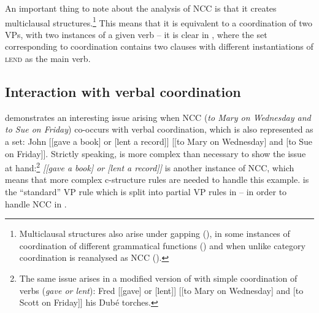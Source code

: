 \documentclass[output=paper]{../langscibook}
\begin{document}
An important thing to note about the \citet{max:man:96} analysis of NCC
is that it creates multiclausal structures.\footnote{Multiclausal
  structures also arise under gapping (), in
  some instances of coordination of different grammatical functions
  () and when unlike category coordination is
  reanalysed as NCC ().} This means that it is equivalent to a
coordination of two VPs, with two instances of a given verb – it is
clear in , where the set corresponding to
coordination contains two clauses with different instantiations of \textsc{lend} as the main verb.

\subsection{Interaction with verbal coordination}
\label{sec:Coordination:NCC:sets}
\largerpage
{} demonstrates an
interesting issue arising when NCC
(\emph{to Mary on Wednesday and to Sue on Friday}) co-occurs with
verbal coordination, which is also represented as a set:
\ea\label{ex:max:man:96:43} John [[gave a book] or [lent a record]] [[to Mary on Wednesday] and [to Sue on Friday]]. \hfill\citep[(43)]{max:man:96}
\z
Strictly speaking,  is more complex than necessary to show the
issue at hand:\footnote{The same issue arises in a modified version
  of  with simple coordination of verbs (\emph{gave or
  lent}):
\ea Fred [[gave] or [lent]] [[to Mary on Wednesday] and [to Scott on Friday]] his Dubé torches.
\z
}
 \emph{[[gave a book] or [lent a record]]} is
another instance of NCC, which means that more complex
c-structure rules are needed to handle this example.
 is the ``standard'' VP rule which is split
into partial VP rules in
– in order
to handle NCC in .
\ea\label{ex:max:man:96:43:VP:std}
  \z
\ea\label{ex:max:man:96:43:VP:mod}
\z
\ea\label{ex:max:man:96:43:VP-x}
\end{document}
